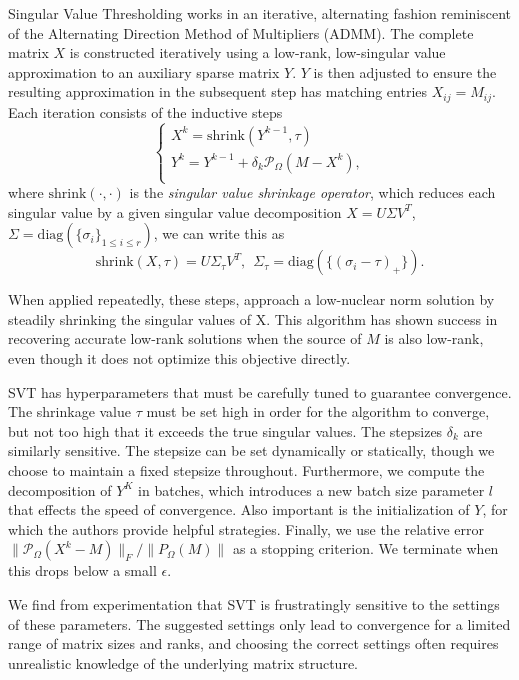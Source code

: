 \documentclass{article} %
\begin{document}
Singular Value Thresholding works in an iterative, alternating fashion
reminiscent of the Alternating Direction Method of Multipliers (ADMM).
The complete matrix $X$ is constructed iteratively using a low-rank,
low-singular value approximation to an auxiliary sparse matrix $Y$.
$Y$ is then adjusted to ensure the resulting approximation in the
subsequent step has matching entries $X_{ij} = M_{ij}$. Each iteration
consists of the inductive steps
\begin{equation*}
\begin{cases}
X^{k} = \mathrm{shrink}(Y^{k-1}, \tau) \\
Y^{k} = Y^{k-1} + \delta_k \mathcal{P}_\Omega (M-X^{k}),              \\
\end{cases}
\end{equation*}
where $\mathrm{shrink}(\cdot, \cdot)$ is the \emph{singular value
  shrinkage operator}, which reduces each singular value by a given
singular value decomposition $X = U \Sigma V^T$,
$\Sigma = \mathrm{diag}(\{\sigma_i\}_{1 \le i \le r})$, we can write
this as
\begin{equation*}
\mathrm{shrink}(X, \tau) = U\Sigma_\tau V^T, \ \ \Sigma_\tau = \mathrm{diag}(\{(\sigma_i-\tau)_{+}\}).
\end{equation*}


When applied repeatedly, these steps, approach a low-nuclear norm
solution by steadily shrinking the singular values of X. This
algorithm has shown success in recovering accurate low-rank solutions
when the source of $M$ is also low-rank, even though it does not
optimize this objective directly.

SVT has hyperparameters that must be carefully tuned to guarantee
convergence. The shrinkage value $\tau$ must be set high in order for
the algorithm to converge, but not too high that it exceeds the true
singular values. The stepsizes $\delta_k$ are similarly sensitive. The
stepsize can be set dynamically or statically, though we choose to
maintain a fixed stepsize throughout. Furthermore, we compute the
decomposition of $Y^K$ in batches, which introduces a new batch size
parameter $l$ that effects the speed of convergence. Also important is
the initialization of $Y$, for which the authors provide helpful
strategies. Finally, we use the relative error
$\|\mathcal{P}_{\Omega}(X^k-M)\|_F / \|P_{\Omega} (M)\|$ as a stopping
criterion. We terminate when this drops below a small $\epsilon$.

We find from experimentation that SVT is frustratingly sensitive to
the settings of these parameters. The suggested settings only lead to
convergence for a limited range of matrix sizes and ranks, and
choosing the correct settings often requires unrealistic knowledge of
the underlying matrix structure.
\end{document}
